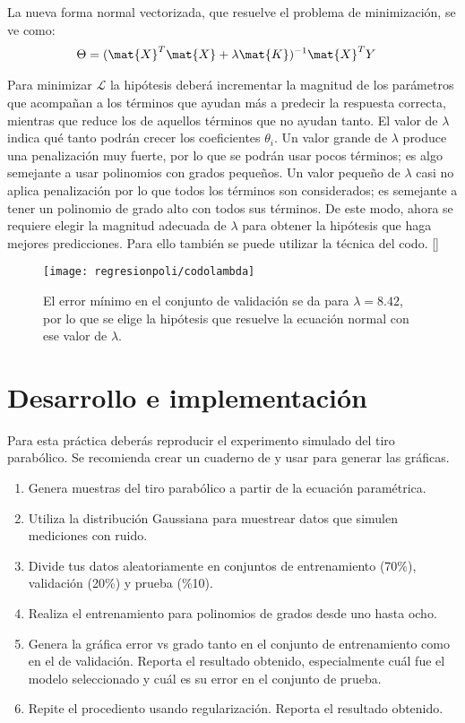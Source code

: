 La nueva forma normal vectorizada, que resuelve el problema de minimización, se ve como:
\begin{align}
 \Theta &= (\mat{X}^T \mat{X} + \lambda \mat{K})^{-1}\mat{X}^T Y
\end{align}

Para minimizar $\mathcal{L}$ la hipótesis deberá incrementar la magnitud de los parámetros que acompañan a los términos que ayudan más a predecir la respuesta correcta, mientras que reduce los de aquellos términos que no ayudan tanto.  El valor de $\lambda$ indica qué tanto podrán crecer los coeficientes $\theta_i$.  Un valor grande de $\lambda$ produce una penalización muy fuerte, por lo que se podrán usar pocos términos; es algo semejante a usar polinomios con grados pequeños.  Un valor pequeño de $\lambda$ casi no aplica penalización por lo que todos los términos son considerados; es semejante a tener un polinomio de grado alto con todos sus términos.  De este modo, ahora se requiere elegir la magnitud adecuada de $\lambda$ para obtener la hipótesis que haga mejores predicciones.  Para ello también se puede utilizar la técnica del codo. []

\begin{figure}
 \centering
 \texttt{[image: regresionpoli/codolambda]}
 \caption{El error mínimo en el conjunto de validación se da para $\lambda=8.42$, por lo que se elige la hipótesis que resuelve la ecuación normal con ese valor de $\lambda$.}\label{fig:codolambda}
\end{figure}




\section{Desarrollo e implementación}

Para esta práctica deberás reproducir el experimento simulado del tiro parabólico.  Se recomienda crear un cuaderno de \Python y usar  para generar las gráficas.

\begin{enumerate}
 \item Genera muestras del tiro parabólico a partir de la ecuación paramétrica.
 \item Utiliza la distribución Gaussiana para muestrear datos que simulen mediciones con ruido.
 \item Divide tus datos aleatoriamente en conjuntos de entrenamiento (70\%), validación (20\%) y prueba (\%10).
 \item Realiza el entrenamiento para polinomios de grados desde uno hasta ocho.
 \item Genera la gráfica error vs grado tanto en el conjunto de entrenamiento como en el de validación. Reporta el resultado obtenido, especialmente cuál fue el modelo seleccionado y cuál es su error en el conjunto de prueba.
 \item Repite el procediento usando regularización. Reporta el resultado obtenido.
\end{enumerate}



